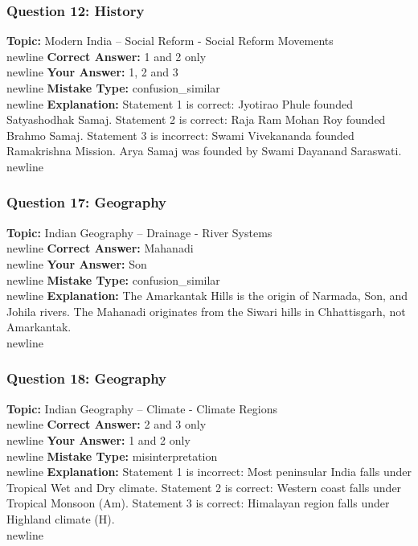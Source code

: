\documentclass[a4paper,12pt]{article}
\begin{document}
\subsubsection{Question 12: History}
\textbf{Topic:} Modern India – Social Reform - Social Reform Movements\\newline
\textbf{Correct Answer:} 1 and 2 only\\newline
\textbf{Your Answer:} \textcolor{wrongred}{1, 2 and 3}\\newline
\textbf{Mistake Type:} confusion\_similar\\newline
\textbf{Explanation:} Statement 1 is correct: Jyotirao Phule founded Satyashodhak Samaj. Statement 2 is correct: Raja Ram Mohan Roy founded Brahmo Samaj. Statement 3 is incorrect: Swami Vivekananda founded Ramakrishna Mission. Arya Samaj was founded by Swami Dayanand Saraswati.\\newline
\vspace{0.5cm}
\subsubsection{Question 17: Geography}
\textbf{Topic:} Indian Geography – Drainage - River Systems\\newline
\textbf{Correct Answer:} Mahanadi\\newline
\textbf{Your Answer:} \textcolor{wrongred}{Son}\\newline
\textbf{Mistake Type:} confusion\_similar\\newline
\textbf{Explanation:} The Amarkantak Hills is the origin of Narmada, Son, and Johila rivers. The Mahanadi originates from the Siwari hills in Chhattisgarh, not Amarkantak.\\newline
\vspace{0.5cm}
\subsubsection{Question 18: Geography}
\textbf{Topic:} Indian Geography – Climate - Climate Regions\\newline
\textbf{Correct Answer:} 2 and 3 only\\newline
\textbf{Your Answer:} \textcolor{wrongred}{1 and 2 only}\\newline
\textbf{Mistake Type:} misinterpretation\\newline
\textbf{Explanation:} Statement 1 is incorrect: Most peninsular India falls under Tropical Wet and Dry climate. Statement 2 is correct: Western coast falls under Tropical Monsoon (Am). Statement 3 is correct: Himalayan region falls under Highland climate (H).\\newline
\vspace{0.5cm}
\end{document}
